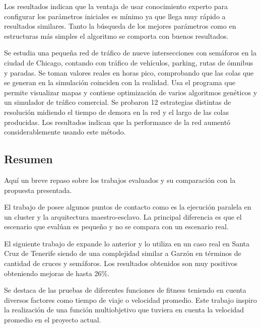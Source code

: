 \begin{itemize}
\begin{item}
		Los resultados indican que la ventaja de usar conocimiento experto para configurar los parámetros iniciales es mínimo ya que llega muy rápido a resultados similares. Tanto la búsqueda de los mejores parámetros como en estructuras más simples el algoritmo se comporta con buenos resultados.
		
	\end{item}	
	
	\begin{item}
		
		Se estudia una pequeña red de tráfico de nueve intersecciones con semáforos en la ciudad de Chicago, contando con tráfico de vehículos, parking, rutas de ómnibus y paradas.  
		Se toman valores reales en horas pico, comprobando que las colas que se generan en la simulación coinciden con la realidad.
		Usa el programa \citep{TRANSYT-7F} que permite visualizar mapas y contiene optimización de varios algoritmos genéticos y \citep{CORSIM}  un simulador de tráfico comercial.
		Se probaron 12 estrategias distintas de resolución midiendo el tiempo de demora en la red y el largo de las colas producidas. Los resultados indican que la performance de la red aumentó considerablemente usando este método.	
	\end{item}	
	
\end{itemize}


\subsection{Resumen}
Aquí un breve repaso sobre los trabajos evaluados y su comparación con la propuesta presentada.

El trabajo de \citet{Sanchez2004} posee algunos puntos de contacto como es la ejecución paralela en un cluster y la arquitectura maestro-esclavo. La principal diferencia es que el escenario que evalúan es pequeño y no se compara con un escenario real.

El siguiente trabajo de \citet{Sanchez2008} expande lo anterior y lo utiliza en un caso real en Santa Cruz de Tenerife siendo de una complejidad similar a Garzón en términos de cantidad de cruces y semáforos. Los resultados obtenidos son muy positivos obteniendo mejoras de hasta 26\%.

Se destaca de \citet{Sanchez2010} las pruebas de diferentes funciones de fitness teniendo en cuenta diversos factores como tiempo de viaje o velocidad promedio. Este trabajo inspiro la realización de una función multiobjetivo que tuviera en cuenta la velocidad promedio en el proyecto actual.

